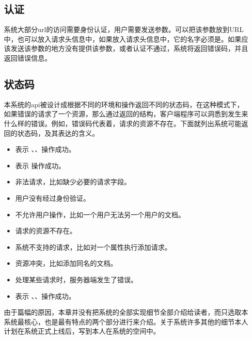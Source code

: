\subsection{认证}
\label{sec:anth}

系统大部分url的访问需要身份认证，用户需要发送参数。可以把该参数放到URL中，也可以放入请求头信息中，如果放入请求头信息中，它的名字必须是。如果应该发送该参数的地方没有提供该参数，或者认证不通过，系统将返回错误码，并且返回错误信息。

\subsection{状态码}
\label{sec:statuscodes}

本系统的api被设计成根据不同的环境和操作返回不同的状态码，在这种模式下，如果错误的请求了一个资源，那么通过返回的结构，客户端程序可以洞悉到发生来什么样的错误。例如，错误码代表着，请求的资源不存在。下面就列出系统可能返回的状态码，及其表达的含义。
\begin{itemize}
\item {} 表示 、、操作成功。
\item {} 表示 操作成功。
\item {} 非法请求，比如缺少必要的请求字段。
\item {} 用户没有经过身份验证。
\item {} 不允许用户操作，比如一个用户无法另一个用户的文档。
\item {} 请求的资源不存在。
\item {} 系统不支持的请求，比如对一个属性执行添加请求。
\item {} 资源冲突，比如添加同名的文档。
\item {} 处理某些请求时，服务器端发生了错误。
\item {} 表示 、、操作成功。
\end{itemize}


由于篇幅的原因，本章并没有把系统的全部实现细节全部介绍给读者，而只选取本系统最核心，也是最有特点的两个部分进行来介绍。关于系统许多其他的细节本人计划在系统正式上线后，写到本人在系统的空间中。